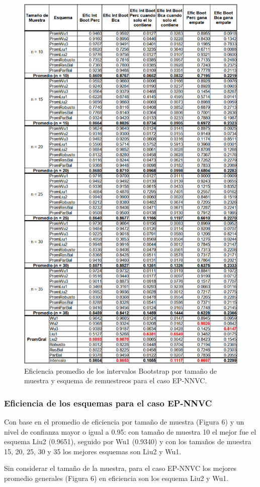 \begin{figure}[ht] 
	\centering 
	\includegraphics[width=0.55\linewidth]{img/EP_NNVC_Efic_Boots.png} 
	\caption{Eficiencia promedio de los intervalos Bootstrap por tamaño de muestra y esquema de remuestreos para el caso EP-NNVC.} 
	\label{fig:EP_NNVC_Boots}
\end{figure}
\FloatBarrier


\subsubsection{Eficiencia de los esquemas para el caso EP-NNVC}
Con base en el promedio de eficiencia por tamaño de muestra (Figura 6) y un nivel de confianza mayor o igual a 0.95: con tamaño de muestra 10 el mejor fue el esquema Liu2 (0.9651), seguido por Wu1 (0.9340) y con los tamaños de muestra 15, 20, 25, 30 y 35 los mejores esquemas son Liu2 y Wu1.
\vspace{.5cm}


Sin considerar el tamaño de la muestra, para el caso EP-NNVC los mejores promedio generales (Figura 6) en eficiencia son los esquema Liu2 y Wu1.


